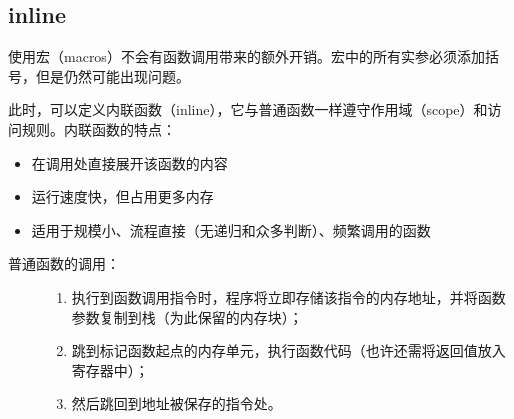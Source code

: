 \documentclass[letterpaper,10pt,english]{sphinxmanual}
\begin{document}
\subsection{inline}
\label{\detokenize{cpp/20_define:inline}}
使用宏（macros）不会有函数调用带来的额外开销。宏中的所有实参必须添加括号，但是仍然可能出现问题。

此时，可以定义内联函数（inline），它与普通函数一样遵守作用域（scope）和访问规则。内联函数的特点：
\begin{itemize}
\item {} 
在调用处直接展开该函数的内容

\item {} 
运行速度快，但占用更多内存

\item {} 
适用于规模小、流程直接（无递归和众多判断）、频繁调用的函数

\end{itemize}
\begin{description}
\item[{普通函数的调用：}] \leavevmode\begin{enumerate}
\item {} 
执行到函数调用指令时，程序将立即存储该指令的内存地址，并将函数参数复制到栈（为此保留的内存块）；

\item {} 
跳到标记函数起点的内存单元，执行函数代码（也许还需将返回值放入寄存器中）；

\item {} 
然后跳回到地址被保存的指令处。

\end{enumerate}

\end{description}
\end{document}
